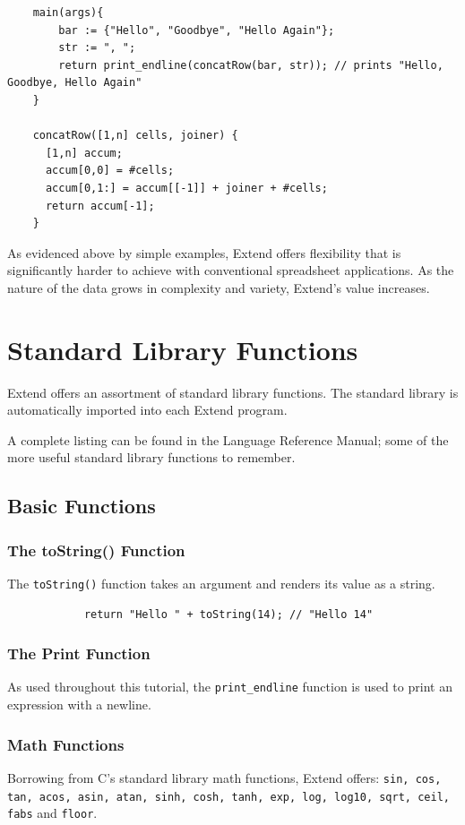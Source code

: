 	\begin{lstlisting}
	main(args){
		bar := {"Hello", "Goodbye", "Hello Again"};
		str := ", ";
		return print_endline(concatRow(bar, str)); // prints "Hello, Goodbye, Hello Again"
	}

	concatRow([1,n] cells, joiner) {
	  [1,n] accum;
	  accum[0,0] = #cells;
	  accum[0,1:] = accum[[-1]] + joiner + #cells;
	  return accum[-1];
	}
	\end{lstlisting}

	\medskip \noindent As evidenced above by simple examples, Extend offers flexibility that is significantly harder to achieve with conventional spreadsheet applications. As the nature of the data grows in complexity and variety, Extend's value increases.

\section{Standard Library Functions}
Extend offers an assortment of standard library functions. The standard library is automatically imported into each Extend program. 

\medskip \noindent
A complete listing can be found in the Language Reference Manual; some of the more useful standard library functions to remember.
	\subsection{Basic Functions}
		\subsubsection{The toString() Function}
		The \texttt{toString()} function takes an argument and renders its value as a string.

		\begin{lstlisting}
			return "Hello " + toString(14); // "Hello 14"
		\end{lstlisting}

		\subsubsection{The Print Function}
		As used throughout this tutorial, the \texttt{print\_endline} function is used to print an expression with a newline.

		\subsubsection{Math Functions}
		Borrowing from C's standard library math functions, Extend offers: \texttt{sin, cos, tan, acos, asin, atan, sinh, cosh, tanh, exp, log, log10, sqrt, ceil, fabs} and \texttt{floor}.

